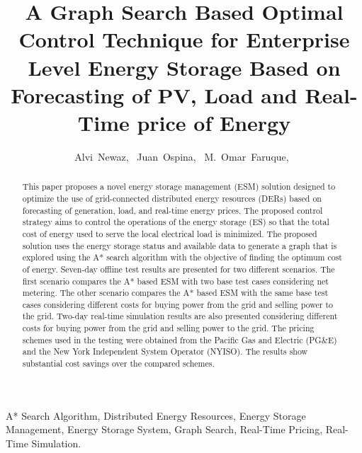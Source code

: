 \documentclass[journal]{IEEEtran}
\begin{document}
\title{A Graph Search Based Optimal Control Technique for Enterprise Level Energy Storage Based on Forecasting of PV, Load and Real-Time price of Energy}

\author{ Alvi~Newaz,~
Juan~Ospina,~
     M.~Omar~Faruque,~
        }%





\maketitle                                                               

\begin{abstract}
This paper proposes a novel energy storage management (ESM) solution designed to optimize the use of grid-connected distributed energy resources (DERs) based on forecasting of generation, load, and real-time energy prices. The proposed control strategy aims to control the operations of the energy storage (ES) so that the total cost of energy used to serve the local electrical load is minimized. The proposed solution uses the energy storage status and available data to generate a graph that is explored using the A* search algorithm with the objective of finding the optimum cost of energy. Seven-day offline test results are presented for two different scenarios. The first scenario compares the A* based ESM with two base test cases considering net metering. The other scenario compares the A* based ESM with the same base test cases considering different costs for buying power from the grid and selling power to the grid. Two-day real-time simulation results are also presented considering different costs for buying power from the grid and selling power to the grid. The pricing schemes used in the testing were obtained from the Pacific Gas and Electric (PG\&E) and the New York Independent System Operator (NYISO). The results show substantial cost savings over the compared schemes. %
\end{abstract}


\begin{IEEEkeywords}
 A* Search Algorithm, Distributed Energy Resources, Energy Storage Management, Energy Storage System, Graph Search, Real-Time Pricing, Real-Time Simulation.
\end{IEEEkeywords}
\end{document}
